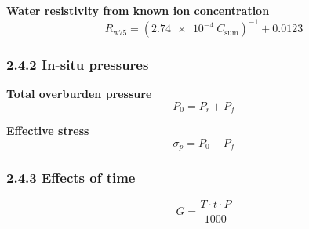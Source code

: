\textbf{Water resistivity from known ion concentration}
\begin{equation*}
    R_{\mathrm{w}75} = \left(\SI{2.74e-4}{}C_\mathrm{sum}\right)^{-1} + 0.0123\tag{2.7}
\end{equation*}

\subsubsection{2.4.2 In-situ pressures}
\textbf{Total overburden pressure}
\begin{equation*}
    P_0 = P_r + P_f\tag{2.8}
\end{equation*}

\textbf{Effective stress}
\begin{equation*}
    \sigma_p = P_0 - P_f\tag{2.9}
\end{equation*}

\subsubsection{2.4.3 Effects of time}
\begin{equation*}
    G = \frac{T\cdot t\cdot P}{1000}\tag{2.10}
\end{equation*}


